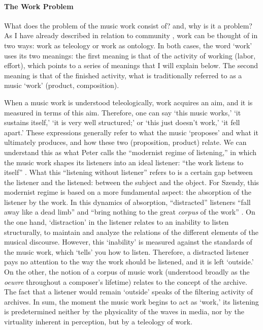 
\paragraph{The Work Problem}
What does the problem of the music work consist of? and, why is it a problem? As I have already described in relation to community , work can be thought of in two ways: work as teleology or work as ontology. In both cases, the word `work' uses its two meanings: the first meaning is that of the activity of working (labor, effort), which points to a series of meanings that I will explain below. The second meaning is that of the finished activity, what is traditionally referred to as a music `work' (product, composition). 

When a music work is understood teleologically, work acquires an aim, and it is measured in terms of this aim. Therefore, one can say `this music works,' `it sustains itself,' `it is very well structured;' or `this just doesn't work,' `it fell apart.' These expressions generally refer to what the music `proposes' and what it ultimately produces, and how these two (proposition, product) relate. We can understand this as what Peter \textcite{Sze08:Lis} calls the ``modernist regime of listening,'' in which the music work shapes its listeners into an ideal listener: ``the work listens to itself'' \parencite[127]{Sze08:Lis}. What this ``listening without listener'' refers to is a certain gap between the listener and the listened: between the subject and the object. For Szendy, this modernist regime is based on a more fundamental aspect: the absorption of the listener by the work. In this dynamics of absorption, ``distracted'' listeners ``fall away like a dead limb'' and ``bring nothing to the great \textit{corpus} of the work'' \parencite[127]{Sze08:Lis}. On the one hand, `distraction' in the listener relates to an inability to listen structurally, to maintain and analyze the relations of the different elements of the musical discourse. However, this `inability' is measured against the standards of the music work, which `tells' you how to listen. Therefore, a distracted listener pays no attention to the way the work should be listened, and it is left `outside.' On the other, the notion of a corpus of music work (understood broadly as the \textit{oeuvre} throughout a composer's lifetime) relates to the concept of the archive. The fact that a listener would remain `outside' speaks of the filtering activity of archives. 
In sum, the moment the music work begins to act as `work,' its listening is predetermined neither by the physicality of the waves in media, nor by the virtuality inherent in perception, but by a teleology of work. 

